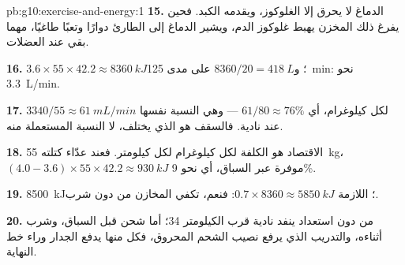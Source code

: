 \begin{solution}{pb:g10:exercise-and-energy:1}
\textbf{15.} الدماغ لا يحرق إلا الغلوكوز، ويقدمه  الكبد. فحين
يفرغ ذلك المخزن يهبط غلوكوز الدم، ويشير الدماغ إلى الطارئ دوارًا
وتعبًا طاغيًا، مهما بقي عند العضلات.

\textbf{16.} $3.6 \times 55 \times 42.2 \approx \qty{8360}{kJ}$؛
و$8360/20 = \qty{418}{L}$ على مدى \qty{125}{min}: نحو \qty{3.3}{L/min}.

\textbf{17.} $3340/55 \approx \qty{61}{mL/min}$ لكل كيلوغرام، أي
$61/80 \approx 76\%$ --- وهي النسبة نفسها عند نادية. فالسقف هو الذي
يختلف، لا النسبة المستعملة منه.

\textbf{18.} الاقتصاد هو الكلفة لكل كيلوغرام لكل كيلومتر. فعند عدّاء
كتلته \qty{55}{kg}، $(4.0 - 3.6) \times 55 \times 42.2 \approx
\qty{930}{kJ}$ موفرة عبر السباق، أي نحو 9\%.

\textbf{19.}  \qty{8500}{kJ}؛  اللازمة
$0.7 \times
8360 \approx \qty{5850}{kJ}$: فنعم، تكفي المخازن من دون شرب.

\textbf{20.} من دون استعداد ينفد  نادية قرب الكيلومتر 34؛ أما
شحن  قبل السباق، وشرب  أثناءه، والتدريب الذي
يرفع نصيب الشحم المحروق، فكل منها يدفع الجدار وراء خط النهاية.
\end{solution}

